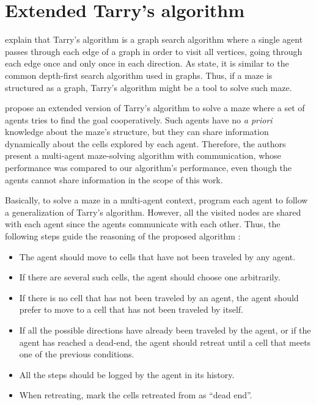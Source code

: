 \section{Extended Tarry's algorithm}
\label{section_models_tarry_algorithm}
 explain that Tarry's algorithm is a graph search algorithm where a single agent passes through each edge of a graph in order to visit all vertices, going through each edge once and only once in each direction. As  state, it is similar to the common depth-first search algorithm used in graphs. Thus, if a maze is structured as a graph, Tarry's algorithm might be a tool to solve such maze.

 propose an extended version of Tarry's algorithm to solve a maze where a set of agents tries to find the goal cooperatively. Such agents have no \textit{a priori} knowledge about the maze's structure, but they can share information dynamically about the cells explored by each agent. Therefore, the authors present a multi-agent maze-solving algorithm with communication, whose performance was compared to our algorithm's performance, even though the agents cannot share information in the scope of this work.

Basically, to solve a maze in a multi-agent context,  program each agent to follow a generalization of Tarry's algorithm. However, all the visited nodes are shared with each agent since the agents communicate with each other. Thus, the following steps guide the reasoning of the proposed algorithm \cite{KivelevitchCohen2010}:

\begin{itemize}
\item The agent should move to cells that have not been traveled by any agent.

\item If there are several such cells, the agent should choose one arbitrarily.

\item If there is no cell that has not been traveled by an agent, the agent should prefer to move to a cell that has not been traveled by itself.

\item If all the possible directions have already been traveled by the agent, or if the agent has reached a dead-end, the agent should retreat until a cell that meets one of the previous conditions.

\item All the steps should be logged by the agent in its history.

\item When retreating, mark the cells retreated from as ``dead end''.
\end{itemize}

